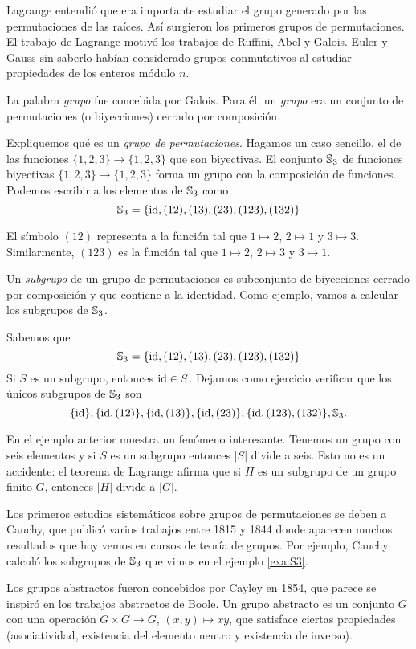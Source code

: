 Lagrange entendió que era importante estudiar el grupo generado por las
permutaciones de las raíces. Así surgieron los primeros 
grupos de permutaciones. 
El trabajo de Lagrange motivó los trabajos de Ruffini, Abel y Galois. 
Euler y Gauss sin saberlo habían considerado grupos conmutativos 
al estudiar propiedades de los enteros módulo $n$. 

La palabra
\emph{grupo} fue concebida por Galois. Para él, un \emph{grupo} era un
conjunto de permutaciones (o biyecciones) cerrado por composición. 

Expliquemos qué es un \emph{grupo de permutaciones}. 
Hagamos un caso sencillo, el de las funciones 
$\{1,2,3\}\to\{1,2,3\}$ que son biyectivas. El conjunto $\mathbb{S}_3$ de funciones
biyectivas $\{1,2,3\}\to\{1,2,3\}$ forma un grupo con la composición de funciones. Podemos escribir
a los elementos de $\mathbb{S}_3$ como
\[
	\mathbb{S}_3=\{\operatorname{id},(12),(13),(23),(123),(132)\}
\]

El símbolo $(12)$ representa a la función tal que $1\mapsto 2$, $2\mapsto 1$ y $3\mapsto 3$. Similarmente, $(123)$ es la función tal que $1\mapsto 2$, $2\mapsto 3$ y $3\mapsto 1$. 


Un \emph{subgrupo} de un grupo de permutaciones es subconjunto de biyecciones  
cerrado por composición y 
que contiene a la identidad. 
Como ejemplo, vamos a calcular los subgrupos de $\mathbb{S}_3$.

\begin{example}
\label{exa:S3}
    Sabemos que 
    \[
	\mathbb{S}_3=\{\operatorname{id},(12),(13),(23),(123),(132)\}
    \]
    Si $S$ es un subgrupo, entonces $\operatorname{id}\in S$. Dejamos como ejercicio
    verificar que los únicos subgrupos de $\mathbb{S}_3$ son
    \[
    \{\operatorname{id}\},\{\operatorname{id},(12)\},\{\operatorname{id},(13)\},\{\operatorname{id},(23)\},\{\operatorname{id},(123),(132)\},\mathbb{S}_3.
    \]
\end{example}

En el ejemplo anterior muestra un fenómeno interesante. Tenemos un grupo con seis
elementos y si $S$ es un subgrupo entonces $|S|$ divide a seis. Esto no es un accidente:  
el teorema de Lagrange afirma que si $H$ es un subgrupo de un grupo finito $G$,
entonces $|H|$ divide a $|G|$. 

Los primeros estudios sistemáticos sobre grupos de permutaciones se deben a Cauchy, que publicó varios trabajos entre 1815 y 1844 donde aparecen muchos resultados 
que hoy vemos en cursos de teoría de grupos. Por ejemplo, Cauchy calculó 
los subgrupos de $\mathbb{S}_3$ que vimos en el ejemplo \ref{exa:S3}. 

Los grupos abstractos fueron concebidos por Cayley en 1854, que parece se
inspiró en los trabajos abstractos de Boole. Un grupo abstracto es un conjunto
$G$ con una operación $G\times G\to G$, $(x,y)\mapsto xy$, que satisface
ciertas propiedades (asociatividad, existencia del elemento neutro 
y existencia de inverso). 

